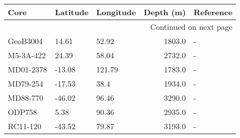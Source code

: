 \begin{longtable}{lllrl}

      Core & Latitude & Longitude &  Depth (m) & Reference \\

\endhead

\multicolumn{5}{r}{{Continued on next page}} \\

\endfoot


\endlastfoot
  GeoB3004 &    14.61 &     52.92 &     1803.0 &         - \\
 M5-3A-422 &    24.39 &     58.04 &     2732.0 &         - \\
 MD01-2378 &   -13.08 &    121.79 &     1783.0 &         - \\
  MD79-254 &   -17.53 &      38.4 &     1934.0 &         - \\
  MD88-770 &   -46.02 &     96.46 &     3290.0 &         - \\
    ODP758 &     5.38 &     90.36 &     2935.0 &         - \\
  RC11-120 &   -43.52 &     79.87 &     3193.0 &         - \\
\end{longtable}
